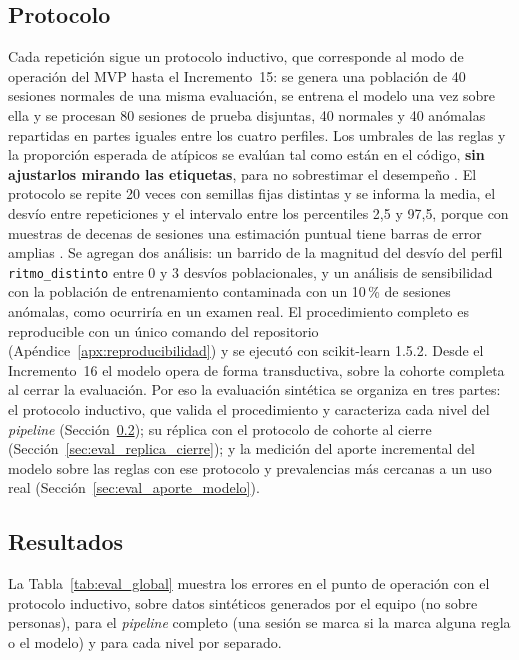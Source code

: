\subsection{Protocolo}

Cada repetición sigue un protocolo inductivo, que corresponde al modo de operación del MVP hasta el Incremento~15: se genera una población de 40 sesiones normales de una misma evaluación, se entrena el modelo una vez sobre ella y se procesan 80 sesiones de prueba disjuntas, 40 normales y 40 anómalas repartidas en partes iguales entre los cuatro perfiles. Los umbrales de las reglas y la proporción esperada de atípicos se evalúan tal como están en el código, \textbf{sin ajustarlos mirando las etiquetas}, para no sobrestimar el desempeño \parencite{Goldstein2016}. El protocolo se repite 20 veces con semillas fijas distintas y se informa la media, el desvío entre repeticiones y el intervalo entre los percentiles 2{,}5 y 97{,}5, porque con muestras de decenas de sesiones una estimación puntual tiene barras de error amplias \parencite{Varoquaux2018}. Se agregan dos análisis: un barrido de la magnitud del desvío del perfil \texttt{ritmo\_distinto} entre 0 y 3 desvíos poblacionales, y un análisis de sensibilidad con la población de entrenamiento contaminada con un 10\,\% de sesiones anómalas, como ocurriría en un examen real. El procedimiento completo es reproducible con un único comando del repositorio (Apéndice~\ref{apx:reproducibilidad}) y se ejecutó con scikit-learn 1.5.2. Desde el Incremento~16 el modelo opera de forma transductiva, sobre la cohorte completa al cerrar la evaluación. Por eso la evaluación sintética se organiza en tres partes: el protocolo inductivo, que valida el procedimiento y caracteriza cada nivel del \textit{pipeline} (Sección~\ref{sec:eval_resultados_sinteticos}); su réplica con el protocolo de cohorte al cierre (Sección~\ref{sec:eval_replica_cierre}); y la medición del aporte incremental del modelo sobre las reglas con ese protocolo y prevalencias más cercanas a un uso real (Sección~\ref{sec:eval_aporte_modelo}).

\subsection{Resultados}
\label{sec:eval_resultados_sinteticos}

La Tabla~\ref{tab:eval_global} muestra los errores en el punto de operación con el protocolo inductivo, sobre datos sintéticos generados por el equipo (no sobre personas), para el \textit{pipeline} completo (una sesión se marca si la marca alguna regla o el modelo) y para cada nivel por separado.

